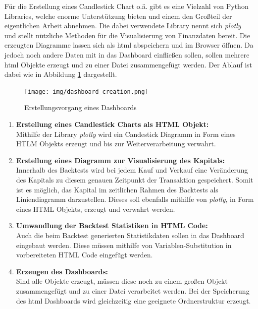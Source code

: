 \documentclass[oneside]{ausarbeitung}
\begin{document}
Für die Erstellung eines Candlestick Chart o.ä. gibt es eine Vielzahl von Python Libraries, welche enorme Unterstützung bieten und einem den Großteil der eigentlichen Arbeit abnehmen. Die dabei verwendete Library nennt sich \textit{plotly} und stellt nützliche Methoden für die Visualisierung von Finanzdaten bereit. Die erzeugten Diagramme lassen sich als \ac{html} abspeichern und im Browser öffnen. Da jedoch noch andere Daten mit in das Dashboard einfließen sollen, sollen mehrere \ac{html} Objekte erzeugt und zu einer Datei zusammengefügt werden. Der Ablauf ist dabei wie in Abbildung \ref{fig:18} dargestellt.

\begin{figure}[H]
  \centering
  \texttt{[image: img/dashboard\_creation.png]}
  \caption{Erstellungsvorgang eines Dashboards}
  \label{fig:18}
\end{figure}

\begin{enumerate}
	\item \textbf{Erstellung eines Candlestick Charts als HTML Objekt:} \\
		Mithilfe der Library \textit{plotly} wird ein Candestick Diagramm in Form
		eines HTLM Objekts erzeugt und bis zur Weiterverarbeitung verwahrt.
	\item \textbf{Erstellung eines Diagramm zur Visualisierung des Kapitals:} \\
		Innerhalb des Backtests wird bei jedem Kauf und Verkauf eine Veränderung
		des Kapitals zu diesem genauen Zeitpunkt der Transaktion gespeichert.
		Somit ist es möglich, das Kapital im zeitlichen Rahmen des Backtests als
		Liniendiagramm darzustellen. Dieses soll ebenfalls mithilfe von
		\textit{plotly}, in Form eines HTML Objekts, erzeugt und verwahrt werden.
	\item \textbf{Umwandlung der Backtest Statistiken in HTML Code:} \\
		Auch die beim Backtest generierten Statistikdaten sollen in das Dashboard
		eingebaut werden. Diese müssen mithilfe von Variablen-Substitution in
		vorbereiteten HTML Code eingefügt werden.
	\item \textbf{Erzeugen des Dashboards:} \\
		Sind alle Objekte erzeugt, müssen diese noch zu einem großen Objekt
		zusammengefügt und zu einer Datei verarbeitet werden. Bei der Speicherung
		des \ac{html} Dashboards wird gleichzeitig eine geeignete Ordnerstruktur
		erzeugt.
\end{enumerate}
\end{document}
